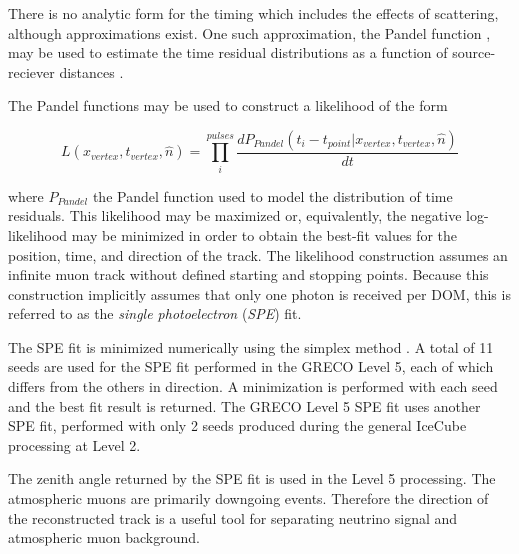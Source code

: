 There is no analytic form for the timing which includes the effects of scattering, although approximations exist.
One such approximation, the Pandel function \cite{Thesis-Pandel}, may be used to estimate the time residual distributions as a function of source-reciever distances \cite{Pandel_SPE}.

The Pandel functions may be used to construct a likelihood of the form

\begin{equation}
L\left(x_{vertex}, t_{vertex}, \hat{n}\right) = 
 \prod_{i}^{pulses} \frac{dP_{Pandel}\left(t_i-t_{point} | x_{vertex}, t_{vertex}, \hat{n}\right) }{dt}
\end{equation}

where $P_{Pandel}$ the Pandel function used to model the distribution of time residuals.
This likelihood may be maximized or, equivalently, the negative log-likelihood may be minimized in order to obtain the best-fit values for the position, time, and direction of the track.
The likelihood construction assumes an infinite muon track without defined starting and stopping points.
Because this construction implicitly assumes that only one photon is received per DOM, this is referred to as the \emph{single photoelectron} (\emph{SPE}) fit.

The SPE fit is minimized numerically using the simplex method \cite{Simplex}.
A total of 11 seeds are used for the SPE fit performed in the GRECO Level 5, each of which differs from the others in direction.
A minimization is performed with each seed and the best fit result is returned.
The GRECO Level 5 SPE fit uses another SPE fit, performed with only 2 seeds produced during the general IceCube processing at Level 2.

The zenith angle returned by the SPE fit is used in the Level 5 processing.
The atmospheric muons are primarily downgoing events. 
Therefore the direction of the reconstructed track is a useful tool for separating neutrino signal and atmospheric muon background.

